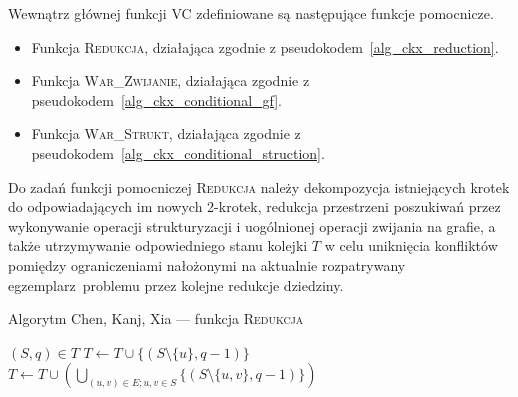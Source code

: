 {  Wewnątrz głównej funkcji \textsc{VC} zdefiniowane są następujące funkcje pomocnicze.
  \begin{itemize}
    \item Funkcja \textsc{Redukcja}, działająca zgodnie z pseudokodem~\ref{alg_ckx_reduction}.
    \item Funkcja \textsc{War\_Zwijanie}, działająca zgodnie z pseudokodem~\ref{alg_ckx_conditional_gf}.
    \item Funkcja \textsc{War\_Strukt}, działająca zgodnie z pseudokodem~\ref{alg_ckx_conditional_struction}.
  \end{itemize}

  Do zadań funkcji pomocniczej \textsc{Redukcja} należy dekompozycja istniejących krotek do odpowiadających im nowych 2-krotek, redukcja przestrzeni poszukiwań przez wykonywanie operacji strukturyzacji i uogólnionej operacji zwijania na grafie, a także utrzymywanie odpowiedniego stanu kolejki $T$ w celu uniknięcia konfliktów pomiędzy ograniczeniami nałożonymi na aktualnie rozpatrywany egzemplarz problemu przez kolejne redukcje dziedziny.

  \begin{algorithm}
   \caption{Algorytm Chen, Kanj, Xia --- funkcja \textsc{Redukcja}}\label{alg_ckx_reduction}
   \begin{algorithmic}[1]
      \ForAll$(S, q) \in T$
        \EndIf
          \State$T \gets T \cup \{(S \setminus \{u\}, q-1)\}$\label{a2}
        \EndFor
          \State$T \gets T \cup (\bigcup_{(u, v) \in E; u,v \in S}\{(S \setminus \{u, v\}, q-1)\})$\label{a3}
        \EndIf
        \label{a4}
        \EndIf
      \EndFor
      \label{b}
        \State{}
      \EndIf
      \EndIf
    \EndFunction
   \end{algorithmic}
  \end{algorithm}

}
